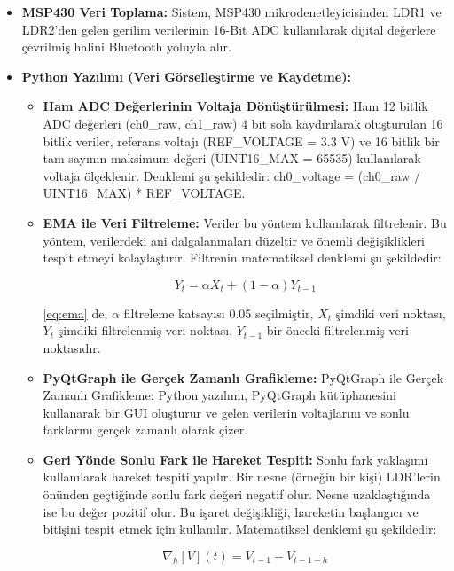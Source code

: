 \begin{itemize}
    \item \textbf{MSP430 Veri Toplama:} Sistem, MSP430 mikrodenetleyicisinden LDR1 ve LDR2'den gelen gerilim verilerinin 16-Bit ADC kullanılarak dijital değerlere çevrilmiş halini Bluetooth yoluyla alır.
    \item \textbf{Python Yazılımı (Veri Görselleştirme ve Kaydetme):}
    \begin{itemize}
        \item \textbf{Ham ADC Değerlerinin Voltaja Dönüştürülmesi:} Ham 12 bitlik ADC değerleri (ch0\_raw, ch1\_raw) 4 bit sola kaydırılarak oluşturulan 16 bitlik veriler, referans voltajı (REF\_VOLTAGE = 3.3 V) ve 16 bitlik bir tam sayının maksimum değeri (UINT16\_MAX = 65535) kullanılarak voltaja ölçeklenir. Denklemi şu şekildedir: ch0\_voltage = (ch0\_raw / UINT16\_MAX) * REF\_VOLTAGE.
        
        \item \textbf{EMA ile Veri Filtreleme:} Veriler bu yöntem kullanılarak filtrelenir. Bu yöntem, verilerdeki ani dalgalanmaları düzeltir ve önemli değişiklikleri tespit etmeyi kolaylaştırır. Filtrenin matematiksel denklemi şu şekildedir:
        
        \begin{equation}
            Y_t=\alpha X_t + (1-\alpha)Y_{t-1}
            \label{eq:ema}
        \end{equation}
        
        \eqref{eq:ema} de, \(\alpha\) filtreleme katsayısı 0.05 seçilmiştir, \(X_t\) şimdiki veri noktası, \(Y_t\) şimdiki filtrelenmiş veri noktası, \(Y_{t-1}\) bir önceki filtrelenmiş veri noktasıdır.

        \item \textbf{PyQtGraph ile Gerçek Zamanlı Grafikleme:} PyQtGraph ile Gerçek Zamanlı Grafikleme: Python yazılımı, PyQtGraph kütüphanesini kullanarak bir GUI oluşturur ve gelen verilerin voltajlarını ve sonlu farklarını gerçek zamanlı olarak çizer.

        \item \textbf{Geri Yönde Sonlu Fark ile Hareket Tespiti:} Sonlu fark yaklaşımı kullanılarak hareket tespiti yapılır. Bir nesne (örneğin bir kişi) LDR'lerin önünden geçtiğinde sonlu fark değeri negatif olur. Nesne uzaklaştığında ise bu değer pozitif olur. Bu işaret değişikliği, hareketin başlangıcı ve bitişini tespit etmek için kullanılır. Matematiksel denklemi şu şekildedir:

        \begin{equation}
            \nabla_h[V](t) = V_{t-1} - V_{t-1-h}
            \label{eq:finite_diff}
        \end{equation}
        

\end{itemize}
\end{itemize}
